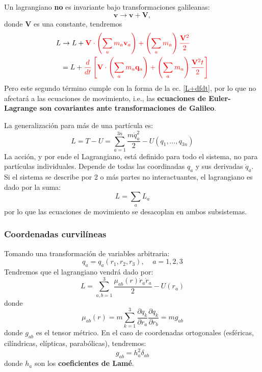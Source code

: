\documentclass[]{article}
\numberwithin{equation}{section}
\begin{document}
Un lagrangiano \textbf{no} es invariante bajo transformaciones galileanas:
\begin{equation*}
	\mathbf{v} \rightarrow \mathbf{v} + \mathbf{V},
\end{equation*}
donde \(\mathbf{V}\) es una constante, tendremos
\begin{align*}
	L &\rightarrow L + \textcolor{red}{\mathbf{V}\cdot\left(\sum_{a}m_a\mathbf{v}_a\right) + \left(\sum_{a}m_a\right)\frac{\mathbf{V}^2}{2}}\\
	&= L + \textcolor{red}{\frac{d}{dt}\left[\mathbf{V}\cdot\left(\sum_{a}m_a\mathbf{q}_a\right) + \left(\sum_{a}m_a\right)\frac{\mathbf{V}^2t}{2}\right]}
\end{align*}
Pero este segundo término cumple con la forma de la ec. \ref{L+dfdt}, por lo que no afectará a las ecuaciones de movimiento, i.e., las \textbf{ecuaciones de Euler-Lagrange son covariantes ante transformaciones de Galileo}.

La generalización para más de una partícula es:
\begin{equation}
	L = T - U = \sum_{a=1}^{3n}\frac{m \dot{q}_a^2}{2} - U(q_1,\ldots,q_{3n})
\end{equation}
La acción, y por ende el Lagrangiano, está definido para todo el sistema, no para partículas individuales. Depende de todas las coordinadas \(q_a\) y sus derivadas \(\dot{q}_a\). Si el sistema se describe por 2 o más partes no interactuantes, el lagrangiano es dado por la suma:
\begin{equation}
	L = \sum_{a} L_a
\end{equation}
por lo que las ecuaciones de movimiento se desacoplan en ambos subsistemas.

\subsubsection{Coordenadas curvilíneas}
Tomando una transformación de variables arbitraria:
\begin{equation*}
	q_a = q_a(r_1, r_2, r_3),\ \ \ \ \ a=1,2,3
\end{equation*}
Tendremos que el lagrangiano vendrá dado por:
\begin{equation}
	L = \sum_{a,b=1}^{3} \frac{\mu_{ab}(r)\dot{r}_a \dot{r}_a}{2} - U(r_a)
\end{equation}
donde
\begin{equation}
	\mu_{ab}(r) = m \sum_{k=1}^{3}\dfrac{\partial q_k}{\partial r_a}\dfrac{\partial q_k}{\partial r_b} = m g_{ab}
\end{equation}
donde \(g_{ab}\) es el tensor métrico. En el caso de coordenadas ortogonales (esféricas, cilíndricas, elípticas, parabólicas), tendremos:
\begin{equation}
	g_{ab} = h_a^2\delta_{ab}
\end{equation}
donde \(h_a\) son los \textbf{coeficientes de Lamé}.
\end{document}
